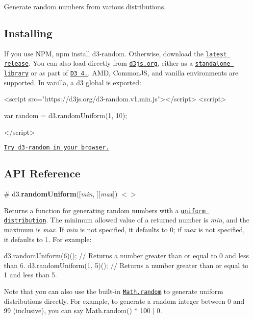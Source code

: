 Generate random numbers from various distributions.

\subsection*{Installing}

If you use N\+PM, {\ttfamily npm install d3-\/random}. Otherwise, download the \href{https://github.com/d3/d3-random/releases/latest}{\tt latest release}. You can also load directly from \href{https://d3js.org}{\tt d3js.\+org}, either as a \href{https://d3js.org/d3-random.v1.min.js}{\tt standalone library} or as part of \href{https://github.com/d3/d3}{\tt D3 4.}. A\+MD, Common\+JS, and vanilla environments are supported. In vanilla, a {\ttfamily d3} global is exported\+:


\begin{DoxyCode}
<script src="https://d3js.org/d3-random.v1.min.js"></script>
<script>

var random = d3.randomUniform(1, 10);

</script>
\end{DoxyCode}


\href{https://runkit.com/npm/d3-random}{\tt Try d3-\/random in your browser.}

\subsection*{A\+PI Reference}

\label{_randomUniform}%
\# d3.{\bfseries random\+Uniform}(\mbox{[}{\itshape min}, \mbox{]}\mbox{[}{\itshape max}\mbox{]}) \href{https://github.com/d3/d3-random/blob/master/src/uniform.js}{\tt $<$$>$}

Returns a function for generating random numbers with a \href{https://en.wikipedia.org/wiki/Uniform_distribution_\(continuous\)}{\tt uniform distribution}. The minimum allowed value of a returned number is {\itshape min}, and the maximum is {\itshape max}. If {\itshape min} is not specified, it defaults to 0; if {\itshape max} is not specified, it defaults to 1. For example\+:


\begin{DoxyCode}
d3.randomUniform(6)(); // Returns a number greater than or equal to 0 and less than 6.
d3.randomUniform(1, 5)(); // Returns a number greater than or equal to 1 and less than 5.
\end{DoxyCode}


Note that you can also use the built-\/in \href{https://developer.mozilla.org/en-US/docs/JavaScript/Reference/Global_Objects/Math/random}{\tt Math.\+random} to generate uniform distributions directly. For example, to generate a random integer between 0 and 99 (inclusive), you can say {\ttfamily Math.\+random() $\ast$ 100 $\vert$ 0}.

